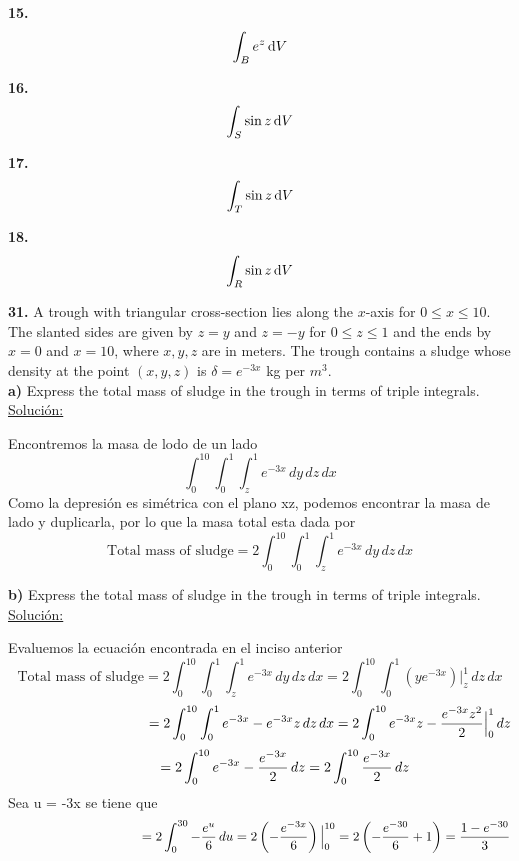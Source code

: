 \documentclass[11pt]{report}
\newcommand{\s}{\underline{Soluci\'{o}n:}}
\begin{document}
\textbf{15.} \\

\[ \int _B e^z \, \text dV \]

\textbf{16.} \\

\[ \int _S \sin{z} \, \text dV \]

\textbf{17.} \\

\[ \int _T \sin{z} \, \text dV \]

\textbf{18.} \\

\[ \int _R \sin{z} \, \text dV \]

\textbf{31.} A trough with triangular cross-section lies along the $x$-axis for
$0 \leq x \leq 10$. The slanted sides are given by $z = y$ and $z = -y$ for
$0 \leq z \leq 1$ and the ends by $x = 0$ and $x = 10$, where $x, y, z$ are in meters.
The trough contains a sludge whose density at the point $(x, y, z)$ is
$\delta = e^{-3x}$ kg per $m^3$. \\

\textbf{a)} Express the total mass of sludge in the trough in terms of triple
integrals. \\

\s

Encontremos la masa de lodo de un lado
\[\int^{10}_{0}\int^{1}_{0}\int^{1}_{z}e^{-3x} \, dy \, dz \, dx\]
Como la depresi\'{o}n es sim\'{e}trica con el plano xz, podemos encontrar la masa
de lado y duplicarla, por lo que la masa total esta dada por
\[\text{Total mass of sludge} = 2 \int^{10}_{0}\int^{1}_{0}\int^{1}_{z}e^{-3x}
 \, dy \, dz \, dx \]

\textbf{b)} Express the total mass of sludge in the trough in terms of triple
integrals. \\

\s

Evaluemos la ecuaci\'{o}n encontrada en el inciso anterior
\[\text{Total mass of sludge} =  2 \int^{10}_{0}\int^{1}_{0}\int^{1}_{z}e^{-3x}
 \, dy \, dz \, dx
 = 2 \int^{10}_{0}\int^{1}_{0}\left(y e^{-3x}\right)\Big|^{1}_{z}\, dz \, dx \]
\[\hspace{3.6cm}= 2 \int^{10}_{0}\int^{1}_{0} e^{-3x}-e^{-3x}z \, dz \, dx
  = 2 \int^{10}_{0} e^{-3x}z-\frac{e^{-3x}z^2}{2} \Big|^{1}_{0}\, dz\]
\[\hspace{1.28cm}= 2 \int^{10}_{0} e^{-3x}-\frac{e^{-3x}}{2} \, dz
  = 2 \int^{10}_{0} \frac{e^{-3x}}{2} \, dz\]
Sea u = -3x se tiene que
\[\hspace{3.57cm}= 2 \int^{30}_{0} -\frac{e^{u}}{6} \, du
  = 2 \left(-\frac{e^{-3x}}{6}\right)\Big|^{10}_{0}
  = 2 \left(-\frac{e^{-30}}{6} + 1 \right)
  = \frac{1-e^{-30}}{3}\]
\end{document}
